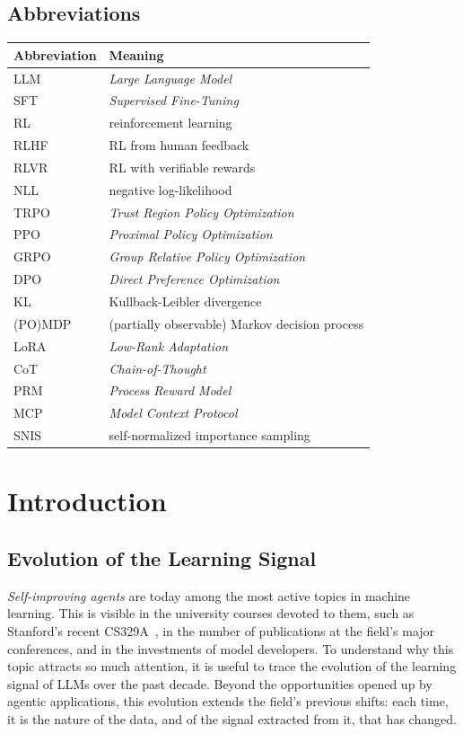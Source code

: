 \documentclass[11pt,a4paper]{article}
\begin{document}
\subsection*{Abbreviations}
\begin{tabular}{ll}
\toprule
Abbreviation & Meaning \\
\midrule
LLM & \emph{Large Language Model} \\
SFT & \emph{Supervised Fine-Tuning} \\
RL & reinforcement learning \\
RLHF & RL from human feedback \\
RLVR & RL with verifiable rewards \\
NLL & negative log-likelihood \\
TRPO & \emph{Trust Region Policy Optimization} \\
PPO & \emph{Proximal Policy Optimization} \\
GRPO & \emph{Group Relative Policy Optimization} \\
DPO & \emph{Direct Preference Optimization} \\
KL & Kullback-Leibler divergence \\
(PO)MDP & (partially observable) Markov decision process \\
LoRA & \emph{Low-Rank Adaptation} \\
CoT & \emph{Chain-of-Thought} \\
PRM & \emph{Process Reward Model} \\
MCP & \emph{Model Context Protocol} \\
SNIS & self-normalized importance sampling \\
\bottomrule
\end{tabular}



\newpage




\section{Introduction}

\subsection{Evolution of the Learning Signal}

\emph{Self-improving agents} are today among the most active topics in machine learning. This is visible in the university courses devoted to them, such as Stanford's recent CS329A~\cite{cs329a}, in the number of publications at the field's major conferences, and in the investments of model developers. To understand why this topic attracts so much attention, it is useful to trace the evolution of the learning signal of LLMs over the past decade. Beyond the opportunities opened up by agentic applications, this evolution extends the field's previous shifts: each time, it is the nature of the data, and of the signal extracted from it, that has changed.
\end{document}
